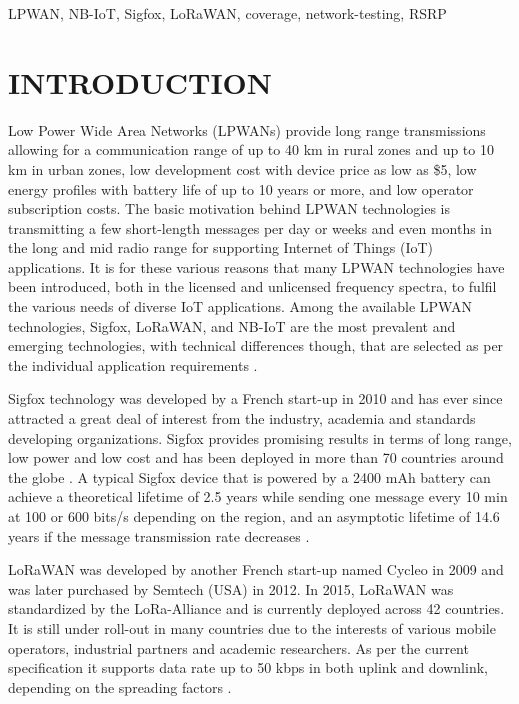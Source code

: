 \documentclass[conference,a4paper,xcolor=table]{IEEEtran}
\begin{document}
\begin{IEEEkeywords}
LPWAN, NB-IoT, Sigfox, LoRaWAN, coverage, network-testing, RSRP 
\end{IEEEkeywords}

\section{INTRODUCTION}
Low Power Wide Area Networks (LPWANs) provide long range transmissions allowing for a communication range of up to 40 km in rural zones and up to 10 km in urban zones\cite{centenaro2016long}, low development cost with device price as low as \$5, low energy profiles with battery life of up to 10 years or more\cite{patel2017experimental}, and low operator subscription costs\cite{raza2017low}. The basic motivation behind LPWAN technologies is transmitting a few short-length messages per day or weeks and even months in the long and mid radio range for supporting Internet of Things (IoT) applications. It is for these various reasons that many LPWAN technologies have been introduced, both in the licensed and unlicensed frequency spectra, to fulfil the various needs of diverse IoT applications. Among the available LPWAN technologies, Sigfox, LoRaWAN, and NB-IoT are the most prevalent and emerging technologies, with technical differences though, that are selected as per the individual application requirements \cite{mekki2018overview}.\par
Sigfox technology was developed by a French start-up in 2010 and has ever since attracted a great deal of interest from the industry, academia and standards developing organizations. Sigfox provides promising results in terms of long range, low power and low cost and has been deployed in more than 70 countries around the globe \cite{sigfoxCoverage}. A typical Sigfox device that is powered by a 2400 mAh battery can achieve a theoretical lifetime of 2.5 years while sending one message every 10 min at 100 or 600 bits/s depending on the region, and an asymptotic lifetime of 14.6 years if the message transmission rate decreases \cite{gomez2019sigfox}.\par
LoRaWAN was developed by another French start-up named Cycleo in 2009 and was later purchased by Semtech (USA) in 2012. In 2015, LoRaWAN was standardized by the LoRa-Alliance and is currently deployed across 42 countries. It is still under roll-out in many countries due to the interests of various mobile operators, industrial partners and academic researchers. As per the current specification it supports data rate up to 50 kbps in both uplink and downlink, depending on the spreading factors \cite{mekki2018overview}. \par
\end{document}
